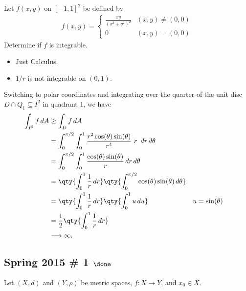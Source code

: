 Let \(f(x, y)\) on \([-1, 1]^2\) be defined by
\begin{align*}
f(x, y) = \begin{cases}
\frac{x y}{\left(x^{2}+y^{2}\right)^{2}} & (x, y) \neq (0, 0) \\
0 & (x, y) = (0, 0)
\end{cases}
\end{align*}
Determine if \(f\) is integrable.

\begin{concept}

\envlist

\begin{itemize}
\tightlist
\item
  Just Calculus.
\item
  \(1/r\) is not integrable on \((0, 1)\).
\end{itemize}

\end{concept}

\begin{solution}

Switching to polar coordinates and integrating over the quarter of the
unit disc \(D \cap Q_1 \subseteq I^2\) in quadrant 1, we have
\begin{align*}
\int_{I^2} f \, dA
&\geq \int_D f \, dA \\
&= \int_0^{\pi/2} \int_0^1 \frac{r^2 \cos(\theta)\sin(\theta)}{r^4} ~r~\,dr\,d\theta\\
&= \int_0^{\pi/2} \int_0^1 \frac{\cos(\theta)\sin(\theta)}{r} \,dr\,d\theta\\
&= \qty{ \int_0^1 {1\over r } \,dr} \qty{ \int_0^{\pi/2} \cos(\theta)\sin(\theta) \,d\theta}  \\
&= \qty{ \int_0^1 {1\over r } \,dr} \qty{ \int_0^{1} u \,du}  && u=\sin(\theta)\\
&= {1\over 2}\qty{ \int_0^1 {1\over r } \,dr} \\
&\longrightarrow\infty
.\end{align*}

\end{solution}

\hypertarget{spring-2015-1-done}{%
\subsection{\texorpdfstring{Spring 2015 \# 1
\(\done\)}{Spring 2015 \# 1 \textbackslash done}}\label{spring-2015-1-done}}

Let \((X, d)\) and \((Y, \rho)\) be metric spaces, \(f: X\to Y\), and
\(x_0 \in X\).

